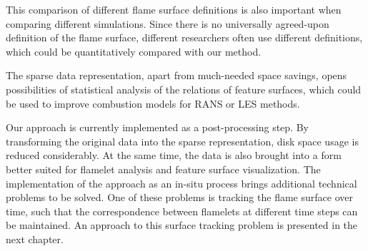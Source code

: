 %
This comparison of different flame surface definitions is also important when
comparing different simulations.
%
Since there is no universally agreed-upon definition of the flame surface,
different researchers often use different definitions, which could be
quantitatively compared with our method.
%

%
The sparse data representation, apart from much-needed space savings, opens
possibilities of statistical analysis of the relations of feature surfaces,
which could be used to improve combustion models for \ac{RANS} or \ac{LES}
methods.
%

%
Our approach is currently implemented as a post-processing step. By transforming
the original data into the sparse representation, disk space usage is reduced
considerably.
%
At the same time, the data is also brought into a form better suited for
flamelet analysis and feature surface visualization.
%
The implementation of the approach as an in-situ process brings additional
technical problems to be solved.
%
One of these problems is tracking the flame surface over time, such that the
correspondence between flamelets at different time steps can be maintained.
%
An approach to this surface tracking problem is presented in the next chapter.
%


%

